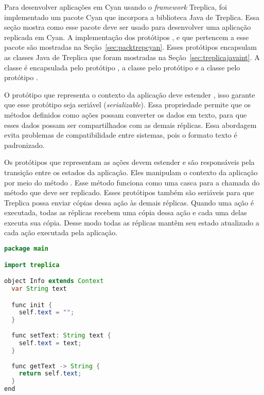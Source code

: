 Para desenvolver aplicações em Cyan usando o \emph{framework} Treplica, foi implementado um pacote Cyan que incorpora a biblioteca Java de Treplica. Essa seção mostra como esse pacote deve ser usado para desenvolver uma aplicação replicada em Cyan. A implementação dos protótipos ,  e  que pertencem a esse pacote são mostradas na Seção~\ref{sec:packtrepcyan}. Esses protótipos encapsulam as classes Java de Treplica que foram mostradas na Seção~\ref{sec:treplicajavaint}. A classe  é encapsulada pelo protótipo , a classe  pelo protótipo  e a classe  pelo protótipo .

O protótipo que representa o contexto da aplicação deve estender , isso garante que esse protótipo seja seriável (\emph{serializable}). Essa propriedade permite que os métodos definidos como ações possam converter os dados em texto, para que esses dados possam ser compartilhados com as demais réplicas. Essa abordagem evita problemas de compatibilidade entre sistemas, pois o formato texto é padronizado.

Os protótipos que representam as ações devem estender  e são responsáveis pela transição entre os estados da aplicação. Eles manipulam o contexto da aplicação por meio do método . Esse método funciona como uma casca para a chamada do método que deve ser replicado. Esses protótipos também são seriáveis para que Treplica possa enviar cópias dessa ação às demais réplicas. Quando uma ação é executada, todas as réplicas recebem uma cópia dessa ação e cada uma delas executa sua cópia. Desse modo todas as réplicas mantêm seu estado atualizado a cada ação executada pela aplicação.

\begin{lstlisting}[language=Java, caption={Exemplo de protótipo que estende \textbf{Context} de Treplica}, label={cod:TreplicaDados}]
package main

import treplica

object Info extends Context
  var String text

  func init { 
    self.text = "";
  }
  
  func setText: String text {
    self.text = text;
  }
  
  func getText -> String {
    return self.text;
  }
end
\end{lstlisting}


